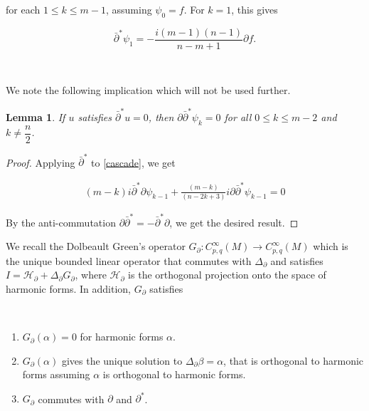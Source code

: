 \documentclass[10pt,a4paper]{amsart}
\newcommand{\sbpartial}{\bar{\partial}^*}
\newcommand{\spartial}{\partial^*}
\newtheorem{lemma}[theorem]{Lemma}
\numberwithin{equation}{section}
\begin{document}
\noindent for each $1 \leq k \leq m-1 $, assuming $\psi
_0 = f$. For $k=1$, this gives



\begin{equation}\label{primitives12}
    \sbpartial\psi_{1} = -\frac{i(m-1)(n-1)}{n-m+1} \partial f.
\end{equation}

\ 

We note the following implication which will not be used further. 

\begin{lemma}
    If $u$ satisfies $\sbpartial u =0$, then $\partial \sbpartial \psi_{k} = 0$ for all $0 \leq k \leq m-2$ and $k \neq \dfrac{n}{2}$. 

    \end{lemma}

\begin{proof}
    Applying $\sbpartial$ to \eqref{cascade}, we get

\begin{equation}
    \begin{aligned}
        (m-k)i \sbpartial \partial \psi_{k-1} + \frac{(m-k)}{(n-2k+3)} i \partial \sbpartial \psi_{k-1} = 0
    \end{aligned}
\end{equation}

By the anti-commutation $\partial \sbpartial = -\sbpartial \partial$, we get the desired result.



\end{proof}


We recall the Dolbeault Green's operator $G_\partial : C^\infty_{p,q}(M) \to C^\infty_{p,q}(M)$ which is the unique bounded linear operator that commutes with $\Delta_\partial$ and satisfies $I = \mathcal{H}_\partial + \Delta_\partial G_\partial$, where $\mathcal{H}_\partial$ is the orthogonal projection onto the space of harmonic forms. In addition, $G_{\partial}$ satisfies

\

\begin{enumerate}
    \item $G_{\partial}(\alpha) = 0$ for harmonic forms $\alpha$.
    \item $G_{\partial}(\alpha)$ gives the unique solution to $\Delta_{\partial} \beta = \alpha$, that is orthogonal to harmonic forms assuming $\alpha$ is orthogonal to harmonic forms. 

    \item $G_{\partial}$ commutes with $\partial$ and $\spartial$.
\end{enumerate}
\end{document}

